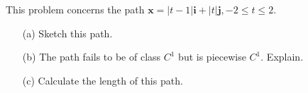 \documentclass[11pt,letterpaper,boxed]{hmcpset}
\begin{document}
\begin{solution}
\vfill
\end{solution}
\newpage

\begin{problem}[Colley 3.2 \#13]
This problem concerns the path $\mathbf{x} = |t-1|\mathbf{i} + |t|\mathbf{j}, -2\leq t \leq 2.$
\begin{enumerate}
	\item[(a)] Sketch this path.
	\item[(b)] The path fails to be of class $C^1$ but is piecewise $C^1$. Explain.
	\item[(c)] Calculate the length of this path.
\end{enumerate}
\end{problem}

\begin{solution}
\vfill
\end{solution}
\newpage
\end{document}
